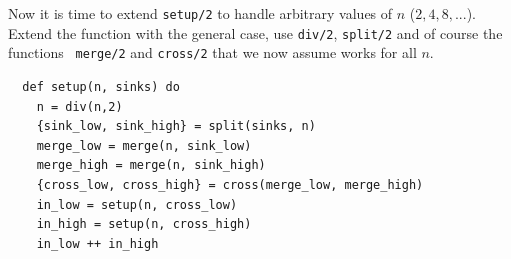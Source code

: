 \documentclass[a4paper,11pt]{article}
\begin{document}
Now it is time to extend {\tt setup/2} to handle arbitrary values of
  $n$ ($2,4,8,...$). Extend the function with the general case, use
  {\tt div/2}, {\tt split/2} and of course the functions {\tt
    merge/2} and {\tt cross/2} that we now assume works for all $n$.




\begin{verbatim}
  def setup(n, sinks) do
    n = div(n,2)
    {sink_low, sink_high} = split(sinks, n)
    merge_low = merge(n, sink_low)
    merge_high = merge(n, sink_high)
    {cross_low, cross_high} = cross(merge_low, merge_high)
    in_low = setup(n, cross_low)
    in_high = setup(n, cross_high)
    in_low ++ in_high
\end{verbatim}
\end{document}
